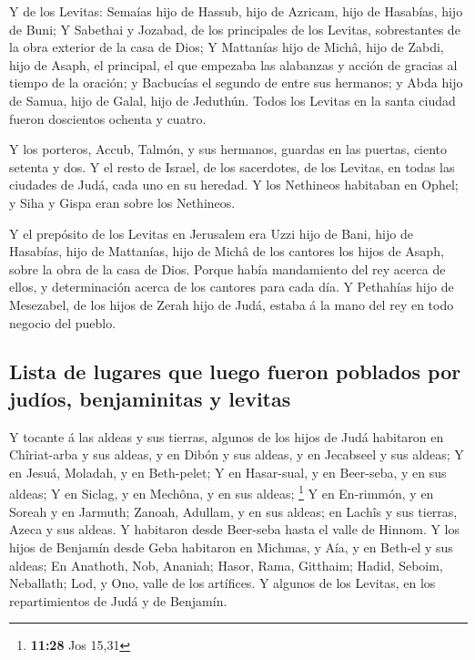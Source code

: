  Y de los Levitas: Semaías hijo de Hassub, hijo de Azricam,
hijo de Hasabías, hijo de Buni;  Y Sabethai y Jozabad, de
los principales de los Levitas, sobrestantes de la obra exterior de la
casa de Dios;  Y Mattanías hijo de Michâ, hijo de Zabdi,
hijo de Asaph, el principal, el que empezaba las alabanzas y acción de
gracias al tiempo de la oración; y Bacbucías el segundo de entre sus
hermanos; y Abda hijo de Samua, hijo de Galal, hijo de Jeduthún.
 Todos los Levitas en la santa ciudad fueron doscientos
ochenta y cuatro.

 Y los porteros, Accub, Talmón, y sus hermanos, guardas en
las puertas, ciento setenta y dos.  Y el resto de Israel,
de los sacerdotes, de los Levitas, en todas las ciudades de Judá, cada
uno en su heredad.  Y los Nethineos habitaban en Ophel; y
Siha y Gispa eran sobre los Nethineos.

 Y el prepósito de los Levitas en Jerusalem era Uzzi hijo
de Bani, hijo de Hasabías, hijo de Mattanías, hijo de Michâ de los
cantores los hijos de Asaph, sobre la obra de la casa de Dios.
 Porque había mandamiento del rey acerca de ellos, y
determinación acerca de los cantores para cada día.  Y
Pethahías hijo de Mesezabel, de los hijos de Zerah hijo de Judá, estaba
á la mano del rey en todo negocio del pueblo.

\hypertarget{lista-de-lugares-que-luego-fueron-poblados-por-juduxedos-benjaminitas-y-levitas}{%
\subsection{Lista de lugares que luego fueron poblados por judíos,
benjaminitas y
levitas}\label{lista-de-lugares-que-luego-fueron-poblados-por-juduxedos-benjaminitas-y-levitas}}

 Y tocante á las aldeas y sus tierras, algunos de los hijos
de Judá habitaron en Chîriat-arba y sus aldeas, y en Dibón y sus aldeas,
y en Jecabseel y sus aldeas;  Y en Jesuá, Moladah, y en
Beth-pelet;  Y en Hasar-sual, y en Beer-seba, y en sus
aldeas;  Y en Siclag, y en Mechôna, y en sus aldeas;
\footnote{\textbf{11:28} Jos 15,31}  Y en En-rimmón, y en
Soreah y en Jarmuth;  Zanoah, Adullam, y en sus aldeas; en
Lachîs y sus tierras, Azeca y sus aldeas. Y habitaron desde Beer-seba
hasta el valle de Hinnom.  Y los hijos de Benjamín desde
Geba habitaron en Michmas, y Aía, y en Beth-el y sus aldeas;
 En Anathoth, Nob, Ananiah;  Hasor, Rama,
Gitthaim;  Hadid, Seboim, Neballath;  Lod, y
Ono, valle de los artífices.  Y algunos de los Levitas, en
los repartimientos de Judá y de Benjamín.

